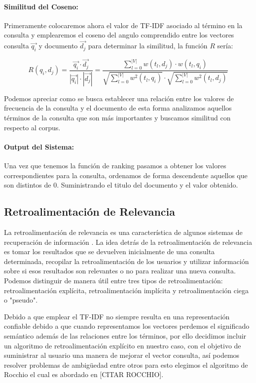 \documentclass[runningheads,a4paper]{llncs}
\begin{document}
\paragraph{Similitud del Coseno:} Primeramente colocaremos ahora el valor de TF-IDF asociado al término en la consulta y emplearemos el coseno del angulo comprendido entre los vectores consulta $\overrightarrow{q_i}$ y documento $\overrightarrow{d_j}$ para determinar la similitud, la función $R$ sería:

\begin{equation}
	R(q_i, d_j) = \frac{\overrightarrow{q_i} \cdot \overrightarrow{d_j}}{|\overrightarrow{q_i}| \cdot |\overrightarrow{d_j}|} = \frac{\sum_{l = 0}^{|V|} w(t_l, d_j) \cdot w(t_l, q_i)}{\sqrt{\sum_{l = 0}^{|V|} w^2(t_l, q_i)} \cdot \sqrt{\sum_{l = 0}^{|V|} w^2(t_l, d_j)}}
\end{equation}

Podemos apreciar como se busca establecer una relación entre los valores de frecuencia de la consulta y el documento de esta forma analizamos aquellos términos de la consulta que son más importantes y buscamos similitud con respecto al corpus.

\paragraph{Output del Sistema:} Una vez que tenemos la función de ranking pasamos a obtener los valores correspondientes para la consulta, ordenamos de forma descendente aquellos que son distintos de 0. Suministrando el titulo del documento y el valor obtenido.

\subsection*{Retroalimentación de Relevancia}

La retroalimentación de relevancia es una característica de algunos sistemas de recuperación de información . La idea detrás de la retroalimentación de relevancia es tomar los resultados que se devuelven inicialmente de una consulta determinada, recopilar la retroalimentación de los usuarios y utilizar información sobre si esos resultados son relevantes o no para realizar una nueva consulta. Podemos distinguir de manera útil entre tres tipos de retroalimentación: retroalimentación explícita, retroalimentación implícita y retroalimentación ciega o "pseudo".

Debido a que emplear el TF-IDF no siempre resulta en una representación confiable debido a que cuando representamos los vectores perdemos el significado semántico además de las relaciones entre los términos, por ello decidimos incluir un algoritmo de retroalimentación explícito en nuestro caso, con el objetivo de suministrar al usuario una manera de mejorar el vector consulta, así podemos resolver problemas de ambigüedad entre otros para esto elegimos el algoritmo de Rocchio el cual es abordado en [CITAR ROCCHIO].
\end{document}

